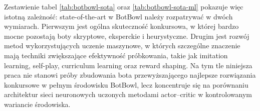 Zestawienie tabel \ref{tab:botbowl-sota} oraz \ref{tab:botbowl-sota-ml} pokazuje więc istotną zależność: state-of-the-art w BotBowl należy rozpatrywać w dwóch wymiarach. Pierwszym jest ogólna skuteczność konkursowa, w której bardzo mocne pozostają boty skryptowe, eksperckie i heurystyczne. Drugim jest rozwój metod wykorzystujących uczenie maszynowe, w których szczególne znaczenie mają techniki zwiększające efektywność próbkowania, takie jak imitation learning, self-play, curriculum learning oraz reward shaping. Na tym tle niniejsza praca nie stanowi próby zbudowania bota przewyższającego najlepsze rozwiązania konkursowe w pełnym środowisku BotBowl, lecz koncentruje się na porównaniu architektur sieci neuronowych uczonych metodami actor--critic w kontrolowanym wariancie środowiska.